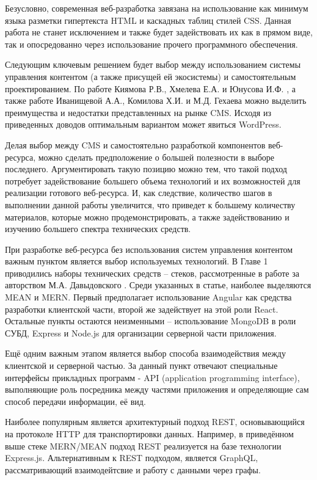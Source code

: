 Безусловно, современная веб-разработка завязана на использование как минимум языка разметки гипертекста HTML и каскадных таблиц стилей CSS.
Данная работа не станет исключением и также будет задействовать их как в прямом виде, так и опосредованно через использование прочего программного обеспечения.

Следующим ключевым решением будет выбор между использованием системы управления контентом (а также присущей ей экосистемы) и самостоятельным проектированием.
По работе Киямова Р.В., Хмелева Е.А. и Юнусова И.Ф. \cite{kiyamov-cms}, а также работе Иванищевой А.А., Комилова Х.И. и М.Д. Гехаева \cite{ivanisheva-cms} можно выделить преимущества и недостатки представленных на рынке CMS.
Исходя из приведенных доводов оптимальным вариантом может явиться WordPress.

Делая выбор между CMS и самостоятельно разработкой компонентов веб-ресурса, можно сделать предположение о большей полезности в выборе последнего.
Аргументировать такую позицию можно тем, что такой подход потребует задействование большего объема технологий и их возможностей для реализации готового веб-ресурса.
И, как следствие, количество шагов в выполнении данной работы увеличится, что приведет к большему количеству материалов, которые можно продемонстрировать, а также задействованию и изучению большего спектра технических средств.

При разработке веб-ресурса без использования систем управления контентом важным пунктом является выбор используемых технологий.
В Главе 1 приводились наборы технических средств -- стеков, рассмотренные в работе за авторством М.А. Давыдовского \cite{davidovsky-vibor}.
Среди указанных в статье, наиболее выделяются MEAN и MERN.
Первый предполагает использование Angular как средства разработки клиентской части, второй же задействует на этой роли React.
Остальные пункты остаются неизменными -- использование MongoDB в роли СУБД, Express и Node.js для организации серверной части приложения.

Ещё одним важным этапом является выбор способа взаимодействия между клиентской и серверной частью.
За данный пункт отвечают специальные интерфейсы прикладных программ - API (application programming interface), выполняющие роль посредника между частями приложения и определяющие сам способ передачи информации, её вид.

Наиболее популярным является архитектурный подход REST, основывающийся на протоколе HTTP для транспортировки данных.
Например, в приведённом выше стеке MERN/MEAN подход REST реализуется на базе технологии Express.js.
Альтернативным к REST подходом, является GraphQL, рассматривающий взаимодейтсвие и работу с данными через графы.

